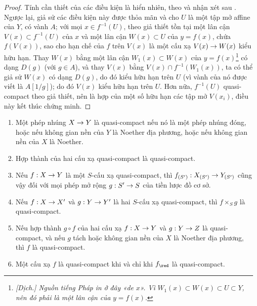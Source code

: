\documentclass[oneside]{amsart}
\makeatletter
\newcommand{\ega@arrow}[2]{\mathchoice{#1}{#2}{#2}{#2}}
\renewcommand{\to}{\ega@arrow{\longrightarrow}{\rightarrow}}
\let\EGAOriginalLabel\label
\renewcommand{\label}[1]{\phantomsection\EGAOriginalLabel{#1}}
\makeatother
\begin{document}
\begin{proof}
Tính cần thiết của các điều kiện là hiển nhiên, theo  và nhận xét sau .
Ngược lại, giả sử các điều kiện này được thỏa mãn và cho $U$ là một tập mở affine của $Y$, có vành $A$;
với mọi $x\in f^{-1}(U)$, theo giả thiết tồn tại một lân cận $V(x)\subset f^{-1}(U)$ của $x$ và một lân cận $W(x)\subset U$ của $y=f(x)$, chứa $f(V(x))$, sao cho hạn chế của $f$ trên $V(x)$ là một cấu xạ $V(x)\to W(x)$ kiểu hữu hạn.
Thay $W(x)$ bằng một lân cận $W_1(x)\subset W(x)$ của $y=f(x)$\footnote{\emph{[Dịch.] Nguồn tiếng Pháp in ở đây «de $x$». Vì $W_1(x)\subset W(x)\subset U\subset Y$, nên đó phải là một lân cận của $y=f(x)$.}} có dạng $D(g)$ (với $g\in A$), và thay $V(x)$ bằng $V(x)\cap f^{-1}(W_1(x))$, ta có thể giả sử $W(x)$ có dạng $D(g)$, do đó kiểu hữu hạn trên $U$ (vì vành của nó được viết là $A[1/g]$);
do đó $V(x)$ kiểu hữu hạn trên $U$.
Hơn nữa, $f^{-1}(U)$ quasi-compact theo giả thiết, nên là hợp của một số hữu hạn các tập mở $V(x_i)$, điều này kết thúc chứng minh.
\end{proof}

\begin{proposition}[6.6.4]
\label{I.6.6.4}
\medskip\noindent
\begin{enumerate}
  \item[{\rm(i)}] Một phép nhúng $X\to Y$ là quasi-compact nếu nó là một phép nhúng đóng, hoặc nếu không gian nền của $Y$ là Noether địa phương, hoặc nếu không gian nền của $X$ là Noether.
  \item[{\rm(ii)}] Hợp thành của hai cấu xạ quasi-compact là quasi-compact.
  \item[{\rm(iii)}] Nếu $f: X\to Y$ là một $S$-cấu xạ quasi-compact, thì $f_{(S')}: X_{(S')}\to Y_{(S')}$ cũng vậy đối với mọi phép mở rộng $g: S'\to S$ của tiền lược đồ cơ sở.
  \item[{\rm(iv)}] Nếu $f:X\to X'$ và $g:Y\to Y'$ là hai $S$-cấu xạ quasi-compact, thì $f\times_S g$ là quasi-compact.
  \item[{\rm(v)}] Nếu hợp thành $g\circ f$ của hai cấu xạ $f: X\to Y$ và $g:Y\to Z$ là quasi-compact, và nếu $g$ tách hoặc không gian nền của $X$ là Noether địa phương, thì $f$ là quasi-compact.
  \item[{\rm(vi)}] Một cấu xạ $f$ là quasi-compact khi và chỉ khi $f_\red$ là quasi-compact.
\end{enumerate}
\end{proposition}
\end{document}
